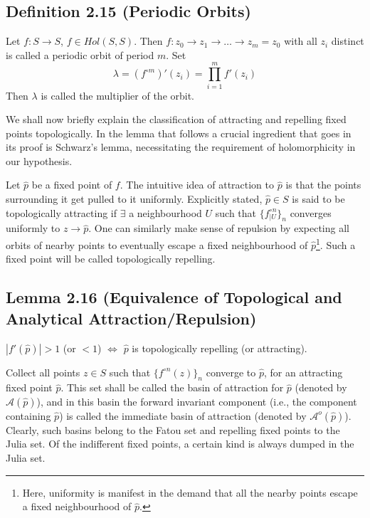 \documentclass[11pt,a4paper]{article}
\begin{document}
        \subsection*{Definition 2.15 (Periodic Orbits)} Let $f: S \rightarrow S$, $f \in Hol(S, S)$. Then $f: z_0 \rightarrow z_1 \rightarrow \ldots \rightarrow z_m = z_0$ with all $z_i$ distinct is called a periodic orbit of period $m$. Set
        $$\lambda = (f^{\circ m})'(z_i) = \prod_{i = 1}^{m}{f'(z_i)}$$ Then $\lambda$ is called the multiplier of the orbit.



        We shall now briefly explain the classification of attracting and repelling fixed points topologically. In the lemma that follows a crucial ingredient that goes in its proof is Schwarz's lemma, necessitating the requirement of holomorphicity in our hypothesis.

        Let $\hat{p}$ be a fixed point of $f$. The intuitive idea of attraction to $\hat{p}$ is that the points surrounding it get pulled to it uniformly. Explicitly stated, $\hat{p} \in S$ is said to be topologically attracting if $\exists$ a neighbourhood $U$ such that $\{f^{\circ n}_{\big|U}\}_n$ converges uniformly to $z \rightarrow \hat{p}$. One can similarly make sense of repulsion by expecting all orbits of nearby points to eventually escape a fixed neighbourhood of $\hat{p}$\footnote{Here, uniformity is manifest in the demand that all the nearby points escape a fixed neighbourhood of $\hat{p}$.}. Such a fixed point will be called topologically repelling.

        \subsection*{Lemma 2.16 (Equivalence of Topological and Analytical Attraction/Repulsion)} $|f'(\hat{p})| > 1$ (or $< 1$) $\iff$ $\hat{p}$ is topologically repelling (or attracting).



        Collect all points $z \in S$ such that $\{f^{\circ n}(z)\}_n$ converge to $\hat{p}$, for an attracting fixed point $\hat{p}$. This set shall be called the basin of attraction for $\hat{p}$ (denoted by $\mathcal{A}(\hat{p})$), and in this basin the forward invariant component (i.e., the component containing $\hat{p}$) is called the immediate basin of attraction (denoted by $\mathcal{A}^o(\hat{p})$). Clearly, such basins belong to the Fatou set and repelling fixed points to the Julia set. Of the indifferent fixed points, a certain kind is always dumped in the Julia set.
\end{document}
